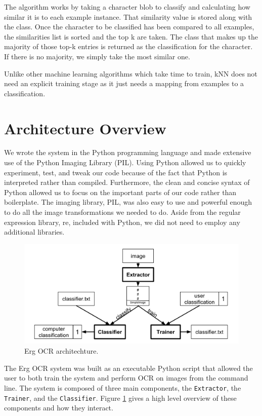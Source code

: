 \documentclass[a4paper,12pt]{article}
\begin{document}
The algorithm works by taking a character blob to classify and calculating how similar it is to each example instance. That similarity value is stored along with the class. Once the character to be classified has been compared to all examples, the similarities list is sorted and the top k are taken. The class that makes up the majority of those top-k entries is returned as the classification for the character. If there is no majority, we simply take the most similar one.


Unlike other machine learning algorithms which take time to train, kNN does not need an explicit training stage as it just needs a mapping from examples to a classification.


\section{Architecture Overview}
We wrote the system in the Python programming language and made extensive use of the Python Imaging Library (PIL). Using Python allowed us to quickly experiment, test, and tweak our code because of the fact that Python is interpreted rather than compiled. Furthermore, the clean and concise syntax of Python allowed us to focus on the important parts of our code rather than boilerplate. The imaging library, PIL, was also easy to use and powerful enough to do all the image transformations we needed to do. Aside from the regular expression library, re, included with Python, we did not need to employ any additional libraries. \\

\begin{figure}[h]
    \centering
    \includegraphics[width=\textwidth]{ergocr2}
    \caption{Erg OCR architechture.}
    \label{fig:ergocr}
\end{figure}

The Erg OCR system was built as an executable Python script that allowed the user to both train the system and perform OCR on images from the command line. The system is composed of three main components, the \texttt{Extractor}, the \texttt{Trainer}, and the \texttt{Classifier}. Figure \ref{fig:ergocr} gives a high level overview of these components and how they interact. \\
\end{document}

